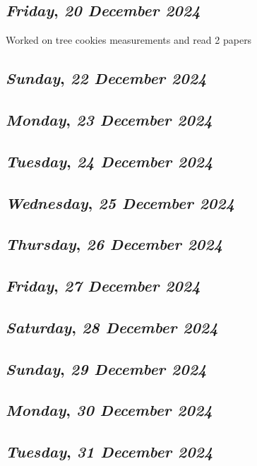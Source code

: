 \def\day{\textit{20 December 2024}}
\def\weekday{\textit{Friday}}
\subsection*{\weekday, \day}
Worked on tree cookies measurements and read 2 papers


\def\day{\textit{22 December 2024}}
\def\weekday{\textit{Sunday}}
\subsection*{\weekday, \day}

\def\day{\textit{23 December 2024}}
\def\weekday{\textit{Monday}}
\subsection*{\weekday, \day}

\def\day{\textit{24 December 2024}}
\def\weekday{\textit{Tuesday}}
\subsection*{\weekday, \day}

\def\day{\textit{25 December 2024}}
\def\weekday{\textit{Wednesday}}
\subsection*{\weekday, \day}

\def\day{\textit{26 December 2024}}
\def\weekday{\textit{Thursday}}
\subsection*{\weekday, \day}

\def\day{\textit{27 December 2024}}
\def\weekday{\textit{Friday}}
\subsection*{\weekday, \day}

\def\day{\textit{28 December 2024}}
\def\weekday{\textit{Saturday}}
\subsection*{\weekday, \day}

\def\day{\textit{29 December 2024}}
\def\weekday{\textit{Sunday}}
\subsection*{\weekday, \day}

\def\day{\textit{30 December 2024}}
\def\weekday{\textit{Monday}}
\subsection*{\weekday, \day}

\def\day{\textit{31 December 2024}}
\def\weekday{\textit{Tuesday}}
\subsection*{\weekday, \day}

